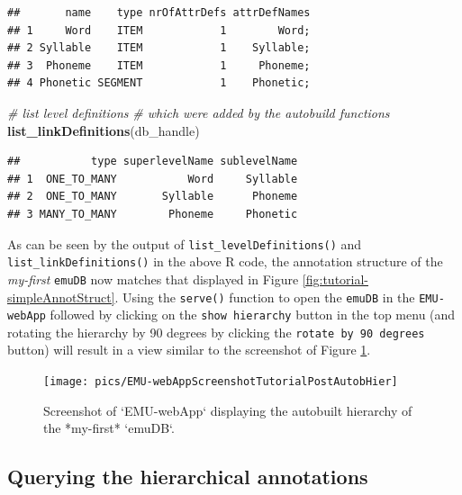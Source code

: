 \documentclass[]{book}
\newenvironment{Shaded}{\begin{snugshade}}{\end{snugshade}}
\newcommand{\CommentTok}[1]{\textcolor[rgb]{0.56,0.35,0.01}{\textit{#1}}}
\newcommand{\KeywordTok}[1]{\textcolor[rgb]{0.13,0.29,0.53}{\textbf{#1}}}
\newcommand{\NormalTok}[1]{#1}
\begin{document}
\begin{verbatim}
##       name    type nrOfAttrDefs attrDefNames
## 1     Word    ITEM            1        Word;
## 2 Syllable    ITEM            1    Syllable;
## 3  Phoneme    ITEM            1     Phoneme;
## 4 Phonetic SEGMENT            1    Phonetic;
\end{verbatim}

\begin{Shaded}
\begin{Highlighting}[]
\CommentTok{# list level definitions}
\CommentTok{# which were added by the autobuild functions}
\KeywordTok{list_linkDefinitions}\NormalTok{(db_handle)}
\end{Highlighting}
\end{Shaded}

\begin{verbatim}
##           type superlevelName sublevelName
## 1  ONE_TO_MANY           Word     Syllable
## 2  ONE_TO_MANY       Syllable      Phoneme
## 3 MANY_TO_MANY        Phoneme     Phonetic
\end{verbatim}

As can be seen by the output of \texttt{list\_levelDefinitions()} and \texttt{list\_linkDefinitions()} in the above R code, the annotation structure of the \emph{my-first} \texttt{emuDB} now matches that displayed in Figure \ref{fig:tutorial-simpleAnnotStruct}. Using the \texttt{serve()} function to open the \texttt{emuDB} in the \texttt{EMU-webApp} followed by clicking on the \texttt{show\ hierarchy} button in the top menu (and rotating the hierarchy by 90 degrees by clicking the \texttt{rotate\ by\ 90\ degrees} button) will result in a view similar to the screenshot of Figure \ref{fig:tutorial-EMU-webAppScreenshotTutorialPostAutobHier}.

\begin{figure}

{\centering \texttt{[image: pics/EMU-webAppScreenshotTutorialPostAutobHier]} 

}

\caption{Screenshot of `EMU-webApp` displaying the autobuilt hierarchy of the *my-first* `emuDB`.}\label{fig:tutorial-EMU-webAppScreenshotTutorialPostAutobHier}
\end{figure}

\hypertarget{querying-the-hierarchical-annotations}{%
\subsection{Querying the hierarchical annotations}\label{querying-the-hierarchical-annotations}}
\end{document}
